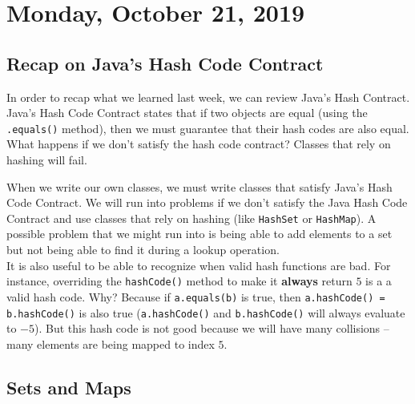 \section{Monday, October 21, 2019}


\subsection{Recap on Java's Hash Code Contract} 

In order to recap what we learned last week, we can review Java's Hash Contract. \\

\noindent Java's Hash Code Contract states that if two objects are equal (using the \verb!.equals()! method), then we must guarantee that their hash codes are also equal. What happens if we don't satisfy the hash code contract? Classes that rely on hashing will fail. 

When we write our own classes, we must write classes that satisfy Java's Hash Code Contract. We will run into problems if we don't satisfy the Java Hash Code Contract and use classes that rely on hashing (like \verb!HashSet! or \verb!HashMap!). A possible problem that we might run into is being able to add elements to a set but not being able to find it during a lookup operation.  \\

It is also useful to be able to recognize when valid hash functions are bad. For instance, overriding the \verb!hashCode()! method to make it \textbf{always} return $5$ is a a valid hash code. Why? Because if \verb!a.equals(b)! is true, then \verb!a.hashCode() = b.hashCode()! is also true (\verb!a.hashCode()! and \verb!b.hashCode()! will always evaluate to $-5$). But this hash code is not good because we will have many collisions -- many elements are being mapped to index $5$. 

\subsection{Sets and Maps}

